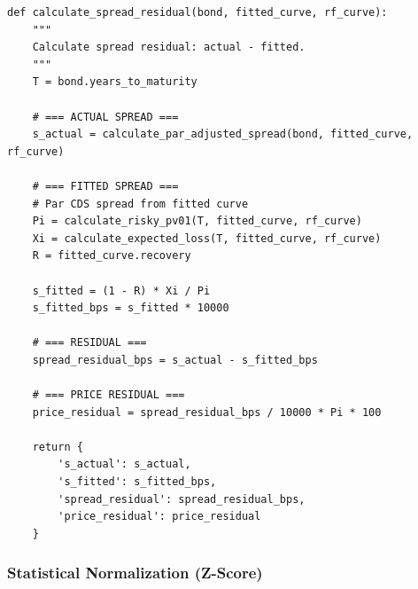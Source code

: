 \documentclass[11pt,a4paper]{article}
\begin{document}
\begin{implbox}
\begin{lstlisting}
def calculate_spread_residual(bond, fitted_curve, rf_curve):
    """
    Calculate spread residual: actual - fitted.
    """
    T = bond.years_to_maturity
    
    # === ACTUAL SPREAD ===
    s_actual = calculate_par_adjusted_spread(bond, fitted_curve, rf_curve)
    
    # === FITTED SPREAD ===
    # Par CDS spread from fitted curve
    Pi = calculate_risky_pv01(T, fitted_curve, rf_curve)
    Xi = calculate_expected_loss(T, fitted_curve, rf_curve)
    R = fitted_curve.recovery
    
    s_fitted = (1 - R) * Xi / Pi
    s_fitted_bps = s_fitted * 10000
    
    # === RESIDUAL ===
    spread_residual_bps = s_actual - s_fitted_bps
    
    # === PRICE RESIDUAL ===
    price_residual = spread_residual_bps / 10000 * Pi * 100
    
    return {
        's_actual': s_actual,
        's_fitted': s_fitted_bps,
        'spread_residual': spread_residual_bps,
        'price_residual': price_residual
    }
\end{lstlisting}
\end{implbox}

\subsubsection{Statistical Normalization (Z-Score)}
\end{document}
